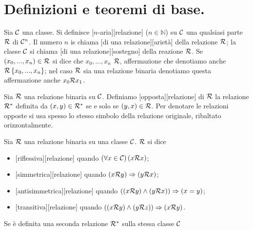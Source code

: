 \section{Definizioni e teoremi di base.}\label{DefinizioniETeoremiDiBase}
\begin{Definition}
	Sia $\mathcal{C}$ una classe. Si definisce [$n$-aria][relazione] ($n \in \mathbb{N}$) su $\mathcal{C}$ una qualsiasi parte $\Relation$ di $\mathcal{C}^n$. Il numero $n$ is chiama [di una relazione][ariet\`a] della relazione $\Relation$; la classe $\mathcal{C}$ si chiama [di una relazione][sostegno] della reazione $\Relation$. Se $(x_0, ..., x_n) \in \Relation$ si dice che $x_0, ..., x_n$  $\Relation$, affermazione che denotiamo anche $\Relation[x_0,...,x_n]$; nel caso $\Relation$ sia una relazione binaria denotiamo questa affermazione anche $x_0 \Relation x_1$.
\end{Definition}
\begin{Definition}
	Sia $\Relation$ una relazione binaria su $\mathcal{C}$. Definiamo [opposta][relazione] di $\Relation$ la relazione $\Dual{\Relation}$ definita da $(x,y) \in \Dual{\Relation}$ se e solo se $(y,x) \in \Relation$. Per denotare le relazioni opposte si usa spesso lo stesso simbolo della relazione originale, ribaltato orizzontalmente.
\end{Definition}
\begin{Definition}
	Sia $\Relation$ una relazione binaria su una classe $\mathcal{C}$. $\Relation$ si dice
	\begin{itemize}
		\item {}[riflessiva][relazione] quando $\ForAll{x \in \Class}{x \Relation x}$;
		\item {}[simmetrica][relazione] quando $\Implies{x \Relation y}{y \Relation x}$;
		\item {}[antisimmetrica][relazione] quando $\Implies{\And{x \Relation y}{y \Relation x}}{x = y}$;
		\item {}[transitiva][relazione] quando $\Implies{\And{x \Relation y}{y \Relation z}}{x \Relation y}$.
	\end{itemize}
	Se \`e definita una seconda relazione $\Dual{\Relation}$ sulla stessa classe $\mathcal{C}$
\end{Definition}
